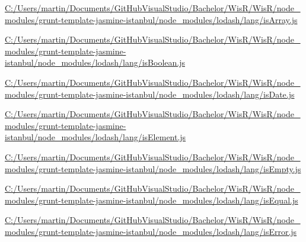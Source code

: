 \begin{DoxyCompactItemize}
\item 
\hyperlink{_c_1_2_users_2martin_2_documents_2_git_hub_visual_studio_2_bachelor_2_wis_r_2_wis_r_2node_moduleb29754afc9a8fc336fe9ca722d60090f}{C\+:/\+Users/martin/\+Documents/\+Git\+Hub\+Visual\+Studio/\+Bachelor/\+Wis\+R/\+Wis\+R/node\+\_\+modules/grunt-\/template-\/jasmine-\/istanbul/node\+\_\+modules/lodash/lang/is\+Array.\+js}
\item 
\hyperlink{_c_1_2_users_2martin_2_documents_2_git_hub_visual_studio_2_bachelor_2_wis_r_2_wis_r_2node_modulef1cb52cf0bb5235039808e198e398dfe}{C\+:/\+Users/martin/\+Documents/\+Git\+Hub\+Visual\+Studio/\+Bachelor/\+Wis\+R/\+Wis\+R/node\+\_\+modules/grunt-\/template-\/jasmine-\/istanbul/node\+\_\+modules/lodash/lang/is\+Boolean.\+js}
\item 
\hyperlink{_c_1_2_users_2martin_2_documents_2_git_hub_visual_studio_2_bachelor_2_wis_r_2_wis_r_2node_modulec8a0507c0c2b86e2ef4a5fea0fbc8dbe}{C\+:/\+Users/martin/\+Documents/\+Git\+Hub\+Visual\+Studio/\+Bachelor/\+Wis\+R/\+Wis\+R/node\+\_\+modules/grunt-\/template-\/jasmine-\/istanbul/node\+\_\+modules/lodash/lang/is\+Date.\+js}
\item 
\hyperlink{_c_1_2_users_2martin_2_documents_2_git_hub_visual_studio_2_bachelor_2_wis_r_2_wis_r_2node_module1c6630a91b17860745665c073ae9b9ce}{C\+:/\+Users/martin/\+Documents/\+Git\+Hub\+Visual\+Studio/\+Bachelor/\+Wis\+R/\+Wis\+R/node\+\_\+modules/grunt-\/template-\/jasmine-\/istanbul/node\+\_\+modules/lodash/lang/is\+Element.\+js}
\item 
\hyperlink{_c_1_2_users_2martin_2_documents_2_git_hub_visual_studio_2_bachelor_2_wis_r_2_wis_r_2node_moduleac24f845bd8a4a86f0bc2c34b8d71959}{C\+:/\+Users/martin/\+Documents/\+Git\+Hub\+Visual\+Studio/\+Bachelor/\+Wis\+R/\+Wis\+R/node\+\_\+modules/grunt-\/template-\/jasmine-\/istanbul/node\+\_\+modules/lodash/lang/is\+Empty.\+js}
\item 
\hyperlink{_c_1_2_users_2martin_2_documents_2_git_hub_visual_studio_2_bachelor_2_wis_r_2_wis_r_2node_module52ed6492123aa1b0a628958c2d83a151}{C\+:/\+Users/martin/\+Documents/\+Git\+Hub\+Visual\+Studio/\+Bachelor/\+Wis\+R/\+Wis\+R/node\+\_\+modules/grunt-\/template-\/jasmine-\/istanbul/node\+\_\+modules/lodash/lang/is\+Equal.\+js}
\item 
\hyperlink{_c_1_2_users_2martin_2_documents_2_git_hub_visual_studio_2_bachelor_2_wis_r_2_wis_r_2node_modulefca44f4ef3c7065d3c0815793f82533a}{C\+:/\+Users/martin/\+Documents/\+Git\+Hub\+Visual\+Studio/\+Bachelor/\+Wis\+R/\+Wis\+R/node\+\_\+modules/grunt-\/template-\/jasmine-\/istanbul/node\+\_\+modules/lodash/lang/is\+Error.\+js}

\end{DoxyCompactItemize}
